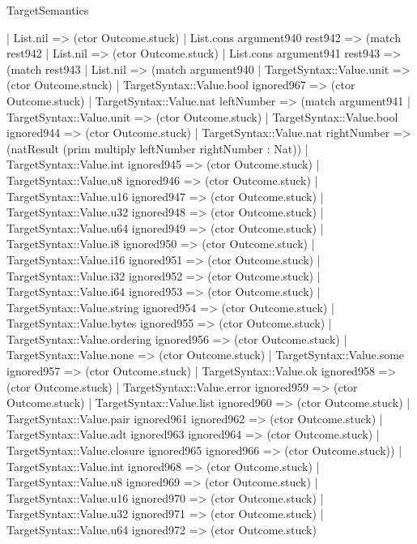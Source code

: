 \begin{lexlean}{TargetSemantics}
\begin{semanticmodule}
{      | List.nil => (ctor Outcome.stuck)
      | List.cons argument940 rest942 => (match rest942
        | List.nil => (ctor Outcome.stuck)
        | List.cons argument941 rest943 => (match rest943
          | List.nil => (match argument940
            | TargetSyntax::Value.unit => (ctor Outcome.stuck)
            | TargetSyntax::Value.bool ignored967 => (ctor Outcome.stuck)
            | TargetSyntax::Value.nat leftNumber => (match argument941
              | TargetSyntax::Value.unit => (ctor Outcome.stuck)
              | TargetSyntax::Value.bool ignored944 => (ctor Outcome.stuck)
              | TargetSyntax::Value.nat rightNumber => (natResult (prim multiply leftNumber rightNumber : Nat))
              | TargetSyntax::Value.int ignored945 => (ctor Outcome.stuck)
              | TargetSyntax::Value.u8 ignored946 => (ctor Outcome.stuck)
              | TargetSyntax::Value.u16 ignored947 => (ctor Outcome.stuck)
              | TargetSyntax::Value.u32 ignored948 => (ctor Outcome.stuck)
              | TargetSyntax::Value.u64 ignored949 => (ctor Outcome.stuck)
              | TargetSyntax::Value.i8 ignored950 => (ctor Outcome.stuck)
              | TargetSyntax::Value.i16 ignored951 => (ctor Outcome.stuck)
              | TargetSyntax::Value.i32 ignored952 => (ctor Outcome.stuck)
              | TargetSyntax::Value.i64 ignored953 => (ctor Outcome.stuck)
              | TargetSyntax::Value.string ignored954 => (ctor Outcome.stuck)
              | TargetSyntax::Value.bytes ignored955 => (ctor Outcome.stuck)
              | TargetSyntax::Value.ordering ignored956 => (ctor Outcome.stuck)
              | TargetSyntax::Value.none => (ctor Outcome.stuck)
              | TargetSyntax::Value.some ignored957 => (ctor Outcome.stuck)
              | TargetSyntax::Value.ok ignored958 => (ctor Outcome.stuck)
              | TargetSyntax::Value.error ignored959 => (ctor Outcome.stuck)
              | TargetSyntax::Value.list ignored960 => (ctor Outcome.stuck)
              | TargetSyntax::Value.pair ignored961 ignored962 => (ctor Outcome.stuck)
              | TargetSyntax::Value.adt ignored963 ignored964 => (ctor Outcome.stuck)
              | TargetSyntax::Value.closure ignored965 ignored966 => (ctor Outcome.stuck))
            | TargetSyntax::Value.int ignored968 => (ctor Outcome.stuck)
            | TargetSyntax::Value.u8 ignored969 => (ctor Outcome.stuck)
            | TargetSyntax::Value.u16 ignored970 => (ctor Outcome.stuck)
            | TargetSyntax::Value.u32 ignored971 => (ctor Outcome.stuck)
            | TargetSyntax::Value.u64 ignored972 => (ctor Outcome.stuck)
}
\end{semanticmodule}
\end{lexlean}
